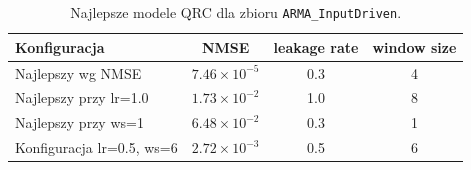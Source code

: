 \begin{table}[ht]
\centering
\caption{Najlepsze modele QRC dla zbioru \texttt{ARMA\_InputDriven}.}
\label{tab:qrc-arma_inputdriven}
\begin{tabular}{lccc}
\toprule
Konfiguracja & NMSE & leakage rate & window size \\
\midrule
Najlepszy wg NMSE & $7.46 \times 10^{-5}$ & 0.3 & 4 \\
Najlepszy przy lr=1.0 & $1.73 \times 10^{-2}$ & 1.0 & 8 \\
Najlepszy przy ws=1 & $6.48 \times 10^{-2}$ & 0.3 & 1 \\
Konfiguracja lr=0.5, ws=6 & $2.72 \times 10^{-3}$ & 0.5 & 6 \\
\bottomrule
\end{tabular}
\end{table}